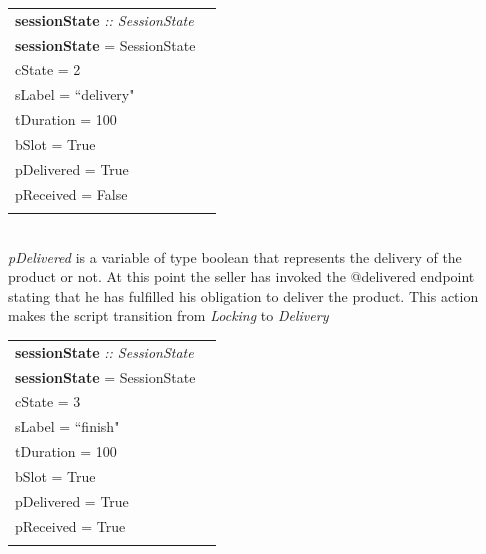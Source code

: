 \documentclass[12pt]{article}
\begin{document}
\begin{tabular}{lr}
\textbf{sessionState} \emph{:: SessionState}\\
\textbf{sessionState}  = SessionState  \textbraceleft{}
\\ \hspace{54mm}cState = 2
\\ \hspace{54mm}sLabel = ``delivery"
\\ \hspace{54mm}tDuration = 100
\\ \hspace{54mm}bSlot = True
\\ \hspace{54mm}pDelivered = True
\\ \hspace{54mm}pReceived = False
\\\hspace{51mm}\textbraceright{} 
\end{tabular}
\\

\emph{pDelivered} is a variable of type boolean that represents the delivery of the product or not. 
At this point the seller has invoked the @delivered endpoint stating that he has fulfilled his obligation to deliver the product. This action makes the script transition from \emph{Locking} to \emph{Delivery}
\\

\begin{tabular}{lr}
\textbf{sessionState} \emph{:: SessionState}\\
\textbf{sessionState}  = SessionState  \textbraceleft{}
\\ \hspace{54mm}cState = 3
\\ \hspace{54mm}sLabel = ``finish"
\\ \hspace{54mm}tDuration = 100
\\ \hspace{54mm}bSlot = True
\\ \hspace{54mm}pDelivered = True
\\ \hspace{54mm}pReceived = True
\\\hspace{51mm}\textbraceright{} 
\end{tabular}
\\
\end{document}
